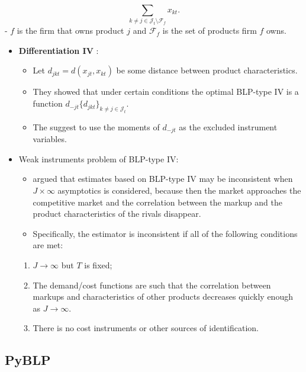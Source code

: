 \documentclass[
]{book}
\providecommand{\tightlist}{%
  \setlength{\itemsep}{0pt}\setlength{\parskip}{0pt}}
\begin{document}
\begin{equation}
\sum_{k \neq j \in \mathcal{J}_t \setminus \mathcal{F}_{f}} x_{kt}.
\end{equation}
- \(f\) is the firm that owns product \(j\) and \(\mathcal{F}_{f}\) is the set of products firm \(f\) owns.

\begin{itemize}
\tightlist
\item
  \textbf{Differentiation IV} \citep{Gandhi2015a}:

  \begin{itemize}
  \tightlist
  \item
    Let \(d_{jkt} = d(x_{jt}, x_{kt})\) be some distance between product characteristics.
  \item
    They showed that under certain conditions the optimal BLP-type IV is a function \(d_{-jt}\{d_{jkt}\}_{k \neq j \in \mathcal{J}_t}\).
  \item
    The suggest to use the moments of \(d_{-jt}\) as the excluded instrument variables.
  \end{itemize}
\item
  Weak instruments problem of BLP-type IV:

  \begin{itemize}
  \tightlist
  \item
    \citet{Armstrong2016b} argued that estimates based on BLP-type IV may be inconsistent when \(J \times \infty\) asymptotics is considered, because then the market approaches the competitive market and the correlation between the markup and the product characteristics of the rivals disappear.
  \item
    Specifically, the estimator is inconsistent if all of the following conditions are met:
  \end{itemize}

  \begin{enumerate}
  \def\labelenumi{\arabic{enumi}.}
  \tightlist
  \item
    \(J \to \infty\) but \(T\) is fixed;
  \item
    The demand/cost functions are such that the correlation between markups and characteristics of other products decreases quickly enough as \(J \to \infty\).
  \item
    There is no cost instruments or other sources of identification.
  \end{enumerate}
\end{itemize}

\hypertarget{pyblp}{%
\subsection{PyBLP}\label{pyblp}}
\end{document}
